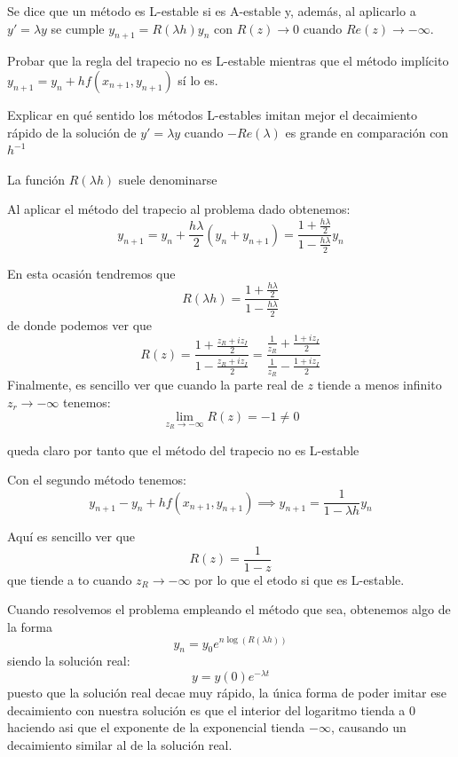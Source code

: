\begin{problem}[7]
Se dice que un método es L-estable si es A-estable y, además, al aplicarlo a $y'=λy$ se cumple $y_{n+1}=R(λh)y_n$ con $R(z)\to 0$ cuando $Re(z) \to -\infty$.

\ppart Probar que la regla del trapecio no es L-estable mientras que el método implícito $y_{n+1}=y_n+hf(x_{n+1},y_{n+1})$ sí lo es.

\ppart Explicar en qué sentido los métodos L-estables imitan mejor el decaimiento rápido de la solución de $y'=λy$ cuando $-Re(λ)$ es grande en comparación con $h^{-1}$
\solution

La función $R(λh)$ suele denominarse 

\spart


Al aplicar el método del trapecio al problema dado obtenemos:
\[y_{n+1} = y_n + \frac{hλ}{2}(y_n+y_{n+1}) = \frac{1+\frac{hλ}{2}}{1-\frac{hλ}{2}}y_n\]

En esta ocasión tendremos que
\[R(λh) = \frac{1+\frac{hλ}{2}}{1-\frac{hλ}{2}}\]
de donde podemos ver que
\[R(z) = \frac{1+\frac{z_R+iz_I}{2}}{1-\frac{z_R+iz_I}{2}} = \frac{\frac{1}{z_R}+\frac{1+iz_I}{2}}{\frac{1}{z_R}-\frac{1+iz_I}{2}}\]
Finalmente, es sencillo ver que cuando la parte real de $z$ tiende a menos infinito $z_r \to - \infty$ tenemos:
\[\lim_{z_R\to -\infty}R(z) = -1 \neq 0\]

queda claro por tanto que el método del trapecio no es L-estable

Con el segundo método tenemos:
\[y_{n+1} - y_n+hf(x_{n+1},y_{n+1}) \implies y_{n+1} = \frac{1}{1-λh}y_n\]

Aquí es sencillo ver que
\[R(z) = \frac{1}{1-z} \]
que tiende a to cuando $z_R \to -\infty$ por lo que el etodo si que es L-estable.

\spart

Cuando resolvemos el problema empleando el método que sea, obtenemos algo de la forma
\[y_n = y_0e^{n\log(R(λh))}\]
siendo la solución real:
\[y=y(0)e^{-λt}\]
puesto que la solución real decae muy rápido, la única forma de poder imitar ese decaimiento con nuestra solución es que el interior del logaritmo tienda a 0 haciendo asi que el exponente de la exponencial tienda $-\infty$, causando un decaimiento similar al de la solución real.
\end{problem}

